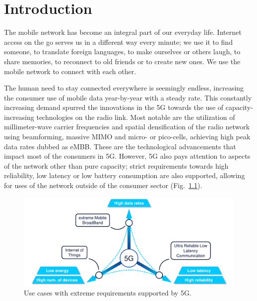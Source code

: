 \chapter{Introduction}
	\label{cha:intro}

	The mobile network has become an integral part of our everyday life.
	Internet access on the go serves us in a different way every minute; we use it to find someone, to translate foreign languages, to make ourselves or others laugh, to share memories, to reconnect to old friends or to create new ones.
	We use the mobile network to connect with each other.
	
	The human need to stay connected everywhere is seemingly endless, increasing the consumer use of mobile data year-by-year with a steady rate.
	This constantly increasing demand spurred the innovations in the \ac{5G} towards the use of capacity-increasing technologies on the radio link. 
	Most notable are the utilization of millimeter-wave carrier frequencies and spatial densification of the radio network using beamforming, massive \ac{MIMO} and micro- or pico-cells, achieving high peak data rates dubbed as \ac{eMBB}.
	These are the technological advancements that impact most of the consumers in \ac{5G}.
	However, \ac{5G} also pays attention to aspects of the network other than pure capacity; strict requirements towards high reliability, low latency or low battery consumption are also supported, allowing for uses of the network outside of the consumer sector (Fig.~\ref{fig:5g_feature_triangle}).
	
	\begin{figure}[ht]
		\centering
		\includegraphics[width=\linewidth]{figures/01_introduction/5g_feature_triangle/5g_feature_triangle.pdf}
		\caption[Use cases with extreme requirements supported by 5G]{Use cases with extreme requirements supported by 5G.}
		\label{fig:5g_feature_triangle}
	\end{figure}
	

